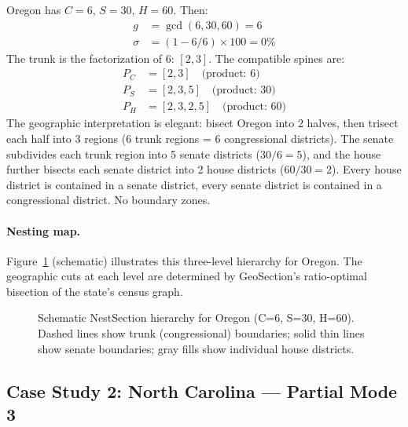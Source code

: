 Oregon has $C = 6$, $S = 30$, $H = 60$.  Then:
\begin{align*}
  g &= \gcd(6, 30, 60) = 6 \\
  \sigma &= (1 - 6/6) \times 100 = 0\%
\end{align*}
The trunk is the factorization of 6: $[2, 3]$.  The compatible spines are:
\begin{align*}
  P_C &= [2, 3] \quad \text{(product: }6\text{)} \\
  P_S &= [2, 3, 5] \quad \text{(product: }30\text{)} \\
  P_H &= [2, 3, 2, 5] \quad \text{(product: }60\text{)}
\end{align*}
The geographic interpretation is elegant: bisect Oregon into 2 halves, then
trisect each half into 3 regions (6 trunk regions = 6 congressional districts).
The senate subdivides each trunk region into 5 senate districts ($30/6 = 5$),
and the house further bisects each senate district into 2 house districts
($60/30 = 2$).  Every house district is contained in a senate district, every
senate district is contained in a congressional district.  No boundary zones.

\paragraph{Nesting map.} Figure~\ref{fig:or-nest} (schematic) illustrates this
three-level hierarchy for Oregon.  The geographic cuts at each level are
determined by GeoSection's ratio-optimal bisection of the state's census graph.

\begin{figure}[h]
\centering
{}
\caption{Schematic NestSection hierarchy for Oregon (C=6, S=30, H=60).
Dashed lines show trunk (congressional) boundaries; solid thin lines show
senate boundaries; gray fills show individual house districts.}
\label{fig:or-nest}
\end{figure}

\subsection{Case Study 2: North Carolina --- Partial Mode 3}

